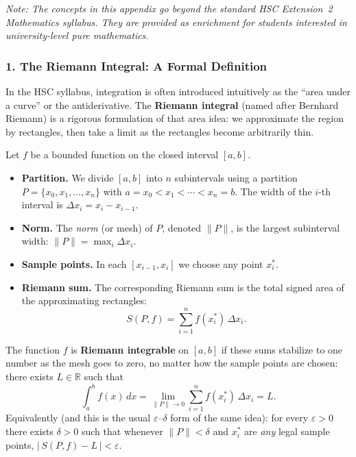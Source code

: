 
\begin{small}
\textit{Note: The concepts in this appendix go beyond the standard HSC Extension~2 Mathematics syllabus. They are provided as enrichment for students interested in university-level pure mathematics.}
\end{small}

\vspace{0.5em}

\subsubsection*{1. The Riemann Integral: A Formal Definition}

In the HSC syllabus, integration is often introduced intuitively as the ``area under a curve'' or the antiderivative. The \textbf{Riemann integral} (named after Bernhard Riemann) is a rigorous formulation of that area idea: we approximate the region by rectangles, then take a limit as the rectangles become arbitrarily thin.

Let $f$ be a bounded function on the closed interval $[a, b]$.

\begin{itemize}[leftmargin=*]
  \item \textbf{Partition.} We divide $[a, b]$ into $n$ subintervals using a partition $P = \{x_0, x_1, \dots, x_n\}$ with $a = x_0 < x_1 < \cdots < x_n = b$. The width of the $i$-th interval is $\Delta x_i = x_i - x_{i-1}$.
  \item \textbf{Norm.} The \textit{norm} (or mesh) of $P$, denoted $\|P\|$, is the largest subinterval width: $\|P\| = \max_i \Delta x_i$.
  \item \textbf{Sample points.} In each $[x_{i-1}, x_i]$ we choose any point $x_i^*$.
  \item \textbf{Riemann sum.} The corresponding Riemann sum is the total signed area of the approximating rectangles:
  \[
    S(P, f) = \sum_{i=1}^{n} f(x_i^*) \, \Delta x_i .
  \]
\end{itemize}

The function $f$ is \textbf{Riemann integrable} on $[a, b]$ if these sums stabilize to one number as the mesh goes to zero, no matter how the sample points are chosen: there exists $L \in \mathbb{R}$ such that
\[
  \int_a^b f(x) \, dx
  = \lim_{\|P\| \to 0} \sum_{i=1}^{n} f(x_i^*) \, \Delta x_i
  = L .
\]
Equivalently (and this is the usual $\varepsilon$--$\delta$ form of the same idea): for every $\varepsilon > 0$ there exists $\delta > 0$ such that whenever $\|P\| < \delta$ and $x_i^*$ are \emph{any} legal sample points,
  $|\,S(P,f) - L\,| < \varepsilon$.

